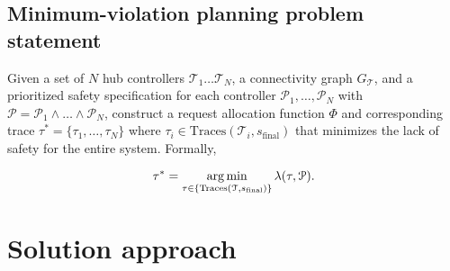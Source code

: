 \subsection{Minimum-violation planning problem statement} 
Given a set of $N$ hub controllers $\mathcal{T}_1 \dots \mathcal{T}_N$, a connectivity graph $G_{\mathcal{T}}$, and a prioritized safety specification for each controller $\mathcal{P}_1,\dots,\mathcal{P}_N$ with $\mathcal{P} = \mathcal{P}_1 \wedge \dots \wedge \mathcal{P}_N $, construct a request allocation function $\Phi$ and corresponding trace $\tau^* = \{\tau_1,\dots,\tau_N\}$ where  $\tau_i \in  \text{Traces}(\mathcal{T}_i,s_{\text{final}})$ that minimizes the lack of safety for the entire system. Formally,

\begin{equation}
    \tau^* = \operatorname*{arg\,min}_{\tau \in \{\text{Traces}(\mathcal{T},s_{\text{final}})\}} \lambda(\tau, \mathcal{P}).
\end{equation}


\section{Solution approach}

